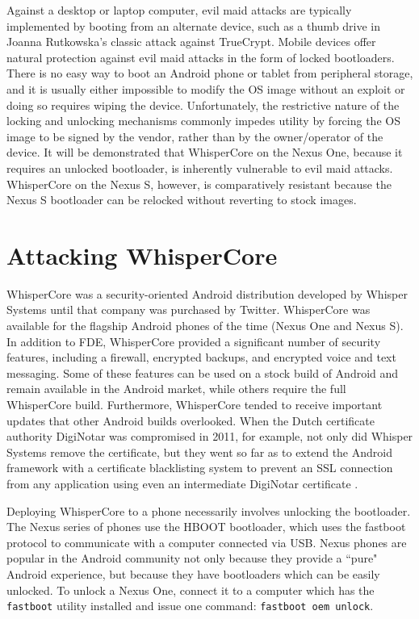 Against a desktop or laptop computer, evil maid attacks are typically implemented by booting from an alternate device, such as a
thumb drive in Joanna Rutkowska's \citeyear{evilmaid} classic attack against TrueCrypt.  Mobile devices offer natural protection against evil
maid attacks in the form of locked bootloaders.  There is no easy way to boot an Android phone or tablet from peripheral storage,
and it is usually either impossible to modify the OS image without an exploit or doing so requires wiping the device.
Unfortunately, the restrictive nature of the locking and unlocking mechanisms commonly impedes utility by forcing the OS image to be
signed by the vendor, rather than by the owner/operator of the device. It will be demonstrated that WhisperCore on the Nexus One,
because it requires an unlocked bootloader, is inherently vulnerable to evil maid attacks.  WhisperCore on the Nexus S, however, is
comparatively resistant because the Nexus S bootloader can be relocked without reverting to stock images.  

\section{Attacking WhisperCore}
WhisperCore was a security-oriented Android distribution developed by Whisper Systems until that company was purchased by Twitter.
WhisperCore was available for the flagship Android phones of the time (Nexus One and Nexus S). In addition to FDE, WhisperCore
provided a significant number of security features, including a firewall, encrypted backups, and encrypted voice and text messaging.
Some of these features can be used on a stock build of Android and remain available in the Android market, while others require the
full WhisperCore build.  Furthermore, WhisperCore tended to receive important updates that other Android builds overlooked. When the
Dutch certificate authority DigiNotar was compromised in 2011, for example, not only did Whisper Systems remove the certificate, but
they went so far as to extend the Android framework with a certificate blacklisting system to prevent an SSL connection from any
application using even an intermediate DigiNotar certificate \cite{whispernotar}. 

Deploying WhisperCore to a phone necessarily involves unlocking the bootloader.  The Nexus series of phones use the HBOOT
bootloader, which uses the fastboot protocol to communicate with a computer connected via USB.  Nexus phones are popular in the
Android community not only because they provide a ``pure" Android experience, but because they have bootloaders which can be easily
unlocked.  To unlock a Nexus One, connect it to a computer which has the \texttt{fastboot} utility installed and issue one command:
\texttt{fastboot oem unlock}.

